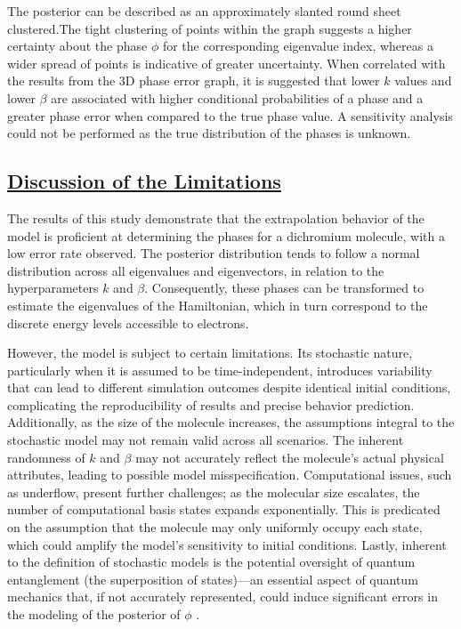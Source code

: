 \documentclass[
]{article}
\begin{document}
The posterior can be described as an approximately slanted round sheet
clustered.The tight clustering of points within the graph suggests a
higher certainty about the phase \(\phi\) for the corresponding
eigenvalue index, whereas a wider spread of points is indicative of
greater uncertainty. When correlated with the results from the 3D phase
error graph, it is suggested that lower \(k\) values and lower \(\beta\)
are associated with higher conditional probabilities of a phase and a
greater phase error when compared to the true phase value. A sensitivity
analysis could not be performed as the true distribution of the phases
is unknown.

\subsection*{\texorpdfstring{\underline{Discussion of the Limitations}}{}}\label{section-6}

The results of this study demonstrate that the extrapolation behavior of
the model is proficient at determining the phases for a dichromium
molecule, with a low error rate observed. The posterior distribution
tends to follow a normal distribution across all eigenvalues and
eigenvectors, in relation to the hyperparameters \(k\) and \(\beta\).
Consequently, these phases can be transformed to estimate the
eigenvalues of the Hamiltonian, which in turn correspond to the discrete
energy levels accessible to electrons.

However, the model is subject to certain limitations. Its stochastic
nature, particularly when it is assumed to be time-independent,
introduces variability that can lead to different simulation outcomes
despite identical initial conditions, complicating the reproducibility
of results and precise behavior prediction. Additionally, as the size of
the molecule increases, the assumptions integral to the stochastic model
may not remain valid across all scenarios. The inherent randomness of
\(k\) and \(\beta\) may not accurately reflect the molecule's actual
physical attributes, leading to possible model misspecification.
Computational issues, such as underflow, present further challenges; as
the molecular size escalates, the number of computational basis states
expands exponentially. This is predicated on the assumption that the
molecule may only uniformly occupy each state, which could amplify the
model's sensitivity to initial conditions. Lastly, inherent to the
definition of stochastic models is the potential oversight of quantum
entanglement (the superposition of states)---an essential aspect of
quantum mechanics that, if not accurately represented, could induce
significant errors in the modeling of the posterior of \(\phi\)
\cite{Yamamoto2023}.
\end{document}
